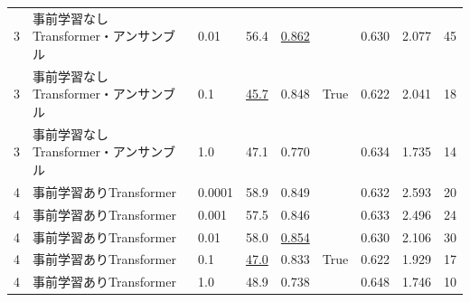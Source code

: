 \documentclass[12pt]{jarticle}
\numberwithin{equation}{section}    %
\numberwithin{figure}{section}      %
\numberwithin{table}{section}      %
\begin{document}
\begin{table}[bt]
\begin{center}
{\begin{tabular}{|l|l|l|rrc|rrr|}
                3                        & 事前学習なしTransformer・アンサンブル & 0.01                                     & 56.4                         & \underline{0.862}         &                            & 0.630                         & 2.077                             & 45                         \\
                3                        & 事前学習なしTransformer・アンサンブル & 0.1                                      & \underline{45.7}             & 0.848                     & True                       & 0.622                         & 2.041                             & 18                         \\
                3                        & 事前学習なしTransformer・アンサンブル & 1.0                                      & 47.1                         & 0.770                     &                            & 0.634                         & 1.735                             & 14                         \\
                \hline
                4                        & 事前学習ありTransformer        & 0.0001                                   & 58.9                         & 0.849                     &                            & 0.632                         & 2.593                             & 20                         \\
                4                        & 事前学習ありTransformer        & 0.001                                    & 57.5                         & 0.846                     &                            & 0.633                         & 2.496                             & 24                         \\
                4                        & 事前学習ありTransformer        & 0.01                                     & 58.0                         & \underline{0.854}         &                            & 0.630                         & 2.106                             & 30                         \\
                4                        & 事前学習ありTransformer        & 0.1                                      & \underline{47.0}             & 0.833                     & True                       & 0.622                         & 1.929                             & 17                         \\
                4                        & 事前学習ありTransformer        & 1.0                                      & 48.9                         & 0.738                     &                            & 0.648                         & 1.746                             & 10                         \\

\end{tabular}}
\end{center}
\end{table}
\end{document}
